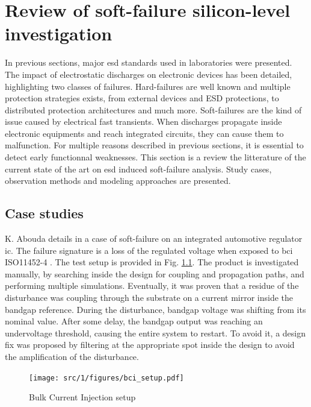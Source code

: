 \section{Review of soft-failure silicon-level investigation}

In previous sections, major \gls{esd} standards used in laboratories were presented.
The impact of electrostatic discharges on electronic devices has been detailed, highlighting two classes of failures.
Hard-failures are well known and multiple protection strategies exists, from external devices and ESD protections, to distributed protection architectures and much more.
Soft-failures are the kind of issue caused by electrical fast transients.
When discharges propagate inside electronic equipments and reach integrated circuits, they can cause them to malfunction.
For multiple reasons described in previous sections, it is essential to detect early functionnal weaknesses.
This section is a review the litterature of the current state of the art on \gls{esd} induced soft-failure analysis.
Study cases, observation methods and modeling approaches are presented.

\subsection{Case studies}

K. Abouda details in \cite{softfailEMCIC} a case of soft-failure on an integrated automotive regulator \gls{ic}.
The failure signature is a loss of the regulated voltage when exposed to \gls{bci} ISO11452-4 \cite{iso11452}.
The test setup is provided in Fig. \ref{}.
The product is investigated manually, by searching inside the design for coupling and propagation paths, and performing multiple simulations.
Eventually, it was proven that a residue of the disturbance was coupling through the substrate on a current mirror inside the bandgap reference.
During the disturbance, bandgap voltage was shifting from its nominal value.
After some delay, the bandgap output was reaching an undervoltage threshold, causing the entire system to restart.
To avoid it, a design fix was proposed by filtering at the appropriate spot inside the design to avoid the amplification of the disturbance.

\begin{figure}[!h]
  \centering
  \texttt{[image: src/1/figures/bci\_setup.pdf]}
  \caption{Bulk Current Injection setup}
  \label{fig:bci-setup}
\end{figure}

